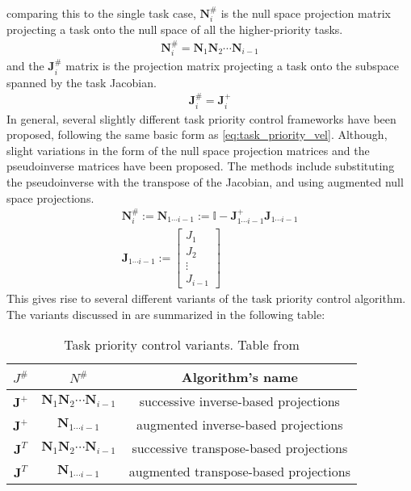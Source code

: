 comparing this to the single task case, $\bm{N}_i^{\#}$ is the null space projection matrix
projecting a task onto the null space of all the higher-priority tasks.
\begin{align}
    \bm{N}_i^{\#} = \bm{N}_1 \bm{N}_2 \cdots \bm{N}_{i-1}
\end{align}
and the $\bm{J}_i^{\#}$ matrix is the projection matrix projecting a task onto the
subspace spanned by the task Jacobian.
\begin{align}
    \bm{J}_i^{\#} = \bm{J}_i^+
\end{align}
In general, several slightly different task priority control frameworks have
been proposed, following the same basic form as \autoref{eq:task_priority_vel}.
Although, slight variations in the form of the null space projection matrices
and the pseudoinverse matrices have been proposed. The methods include substituting
the pseudoinverse with the transpose of the Jacobian, and using augmented null space
projections.
\begin{subequations}
\begin{align}
    \bm{N}_i^{\#} := \bm{N}_{1\cdots i-1} := \mathbb{I} - \bm{J}_{1\cdots i-1}^+ \bm{J}_{1\cdots i-1} \\
    \bm{J}_{1\cdots i-1} := \begin{bmatrix}
        J_1 \\
        J_2 \\
        \vdots \\
        J_{i-1}
    \end{bmatrix}
\end{align}
\end{subequations}
This gives rise to several different variants of the task priority control algorithm.
The variants discussed in \cite{antonelli2009} are summarized in the following table:
\begin{table}[h]
    \centering
    \begin{tabular}{|c|c|c|}
        \hline
        $J^{\#}$ & $N^{\#}$ & Algorithm's name \\
        \hline
        $\bm{J}^+$ & $\bm{N}_1 \bm{N}_2 \cdots \bm{N}_{i-1}$ & successive inverse-based projections \\
        $\bm{J}^+$ & $\bm{N}_{1\cdots i-1}$ & augmented inverse-based projections \\
        $\bm{J}^T$ & $\bm{N}_1 \bm{N}_2 \cdots \bm{N}_{i-1}$ & successive transpose-based projections \\
        $\bm{J}^T$ & $\bm{N}_{1\cdots i-1}$ & augmented transpose-based projections \\
        \hline
    \end{tabular}
    \label{tab:tpc_variants}
    \caption{Task priority control variants. Table from \cite{antonelli2009}}
\end{table}

